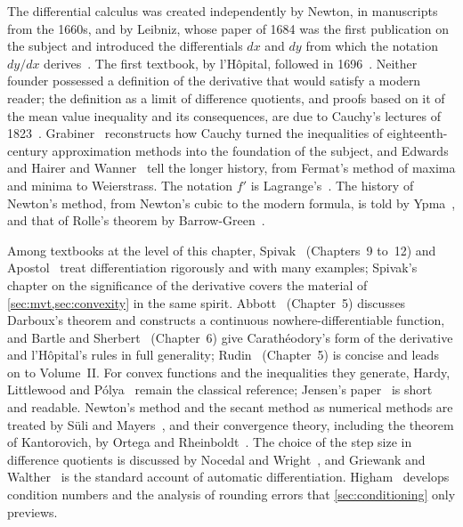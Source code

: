 \chapternotes

The differential calculus was created independently by Newton, in manuscripts from the 1660s, and by Leibniz, whose paper of 1684 was the first publication on the subject and introduced the differentials $dx$ and $dy$ from which the notation $dy/dx$ derives~\cite{leibniz1684}. The first textbook, by l'H\^opital, followed in 1696~\cite{lhopital1696}. Neither founder possessed a definition of the derivative that would satisfy a modern reader; the definition as a limit of difference quotients, and proofs based on it of the mean value inequality and its consequences, are due to Cauchy's lectures of 1823~\cite{cauchy1823}. Grabiner~\cite{grabiner1981} reconstructs how Cauchy turned the inequalities of eighteenth-century approximation methods into the foundation of the subject, and Edwards~\cite{edwards1979} and Hairer and Wanner~\cite{hairer1996analysis} tell the longer history, from Fermat's method of maxima and minima to Weierstrass. The notation $f'$ is Lagrange's~\cite{lagrange1797}. The history of Newton's method, from Newton's cubic to the modern formula, is told by Ypma~\cite{ypma1995}, and that of Rolle's theorem by Barrow-Green~\cite{barrowgreen2009}.

Among textbooks at the level of this chapter, Spivak~\cite{spivak2008calculus} (Chapters~9 to~12) and Apostol~\cite{apostol1967calculus} treat differentiation rigorously and with many examples; Spivak's chapter on the significance of the derivative covers the material of \cref{sec:mvt,sec:convexity} in the same spirit. Abbott~\cite{abbott2015} (Chapter~5) discusses Darboux's theorem and constructs a continuous nowhere-differentiable function, and Bartle and Sherbert~\cite{bartle2011} (Chapter~6) give Carath\'eodory's form of the derivative and l'H\^opital's rules in full generality; Rudin~\cite{rudin1976} (Chapter~5) is concise and leads on to Volume~II. For convex functions and the inequalities they generate, Hardy, Littlewood and P\'olya~\cite{hardy1952inequalities} remain the classical reference; Jensen's paper~\cite{jensen1906} is short and readable. Newton's method and the secant method as numerical methods are treated by S\"uli and Mayers~\cite{suli2003}, and their convergence theory, including the theorem of Kantorovich, by Ortega and Rheinboldt~\cite{ortega2000}. The choice of the step size in difference quotients is discussed by Nocedal and Wright~\cite{nocedal2006}, and Griewank and Walther~\cite{griewank2008} is the standard account of automatic differentiation. Higham~\cite{higham2002accuracy} develops condition numbers and the analysis of rounding errors that \cref{sec:conditioning} only previews.

\chapterreferences
